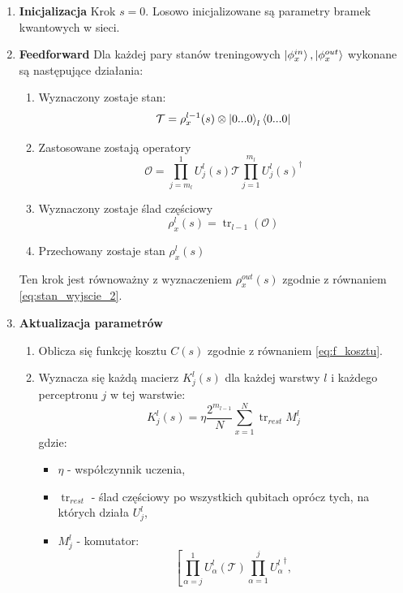 \begin{tcolorbox}[title=Algorytm trenowania głębokiej sieci kwantowej,
    colback=blue!5!white,colframe=blue!75!black,
    breakable]
    
    \begin{enumerate}
        \item \textbf{Inicjalizacja} Krok $s=0$. Losowo inicjalizowane są parametry bramek kwantowych w sieci.
        \item \textbf{Feedforward} Dla każdej pary stanów treningowych $\ket{\phi_x^{in}},\ket{\phi_x^{out}}$ wykonane są następujące działania:
        \begin{enumerate}
            \item Wyznaczony zostaje stan: \[\mathcal{T} =\rho_x^{l-1}(s)\otimes \ket{0...0}_l\bra{0...0} \]
            \item Zastosowane zostają operatory \[\mathcal{O} = \prod_{j=m_l}^{1}U_j^l(s)\mathcal{T}\prod_{j=1}^{m_l}{U_j^l(s)}^{\dagger} \]
            \item Wyznaczony zostaje ślad częściowy \[\rho_x^l(s) = \operatorname{tr}_{l-1}(\mathcal{O}) \]
            \item Przechowany zostaje stan $\rho_x^l(s)$ 
        \end{enumerate}
        Ten krok jest równoważny z wyznaczeniem $\rho_x^{out}(s)$ zgodnie z równaniem \ref{eq:stan_wyjscie_2}.
        \item \textbf{Aktualizacja parametrów}
        \begin{enumerate}
            \item Oblicza się funkcję kosztu $C(s)$ zgodnie z równaniem \ref{eq:f_kosztu}.
            \item Wyznacza się każdą macierz $K_j^l(s)$ dla każdej warstwy $l$ i każdego perceptronu $j$ w tej warstwie:
            \begin{equation}
                K_j^l(s)=\eta \frac{2^{m_{l-1}}}{N}\sum_{x=1}^{N}\operatorname{tr}_{rest}M_j^l
            \end{equation}
            gdzie:
            \begin{itemize}
                \item $\eta$ - współczynnik uczenia,
                \item $\operatorname{tr}_{rest}$ - ślad częściowy po wszystkich qubitach oprócz tych, na których działa $U_j^l$,
                \item $M_j^l$ - komutator:
                \[\left[\prod_{\alpha=j}^{1}U_{\alpha}^l(\mathcal{T})\prod_{\alpha=1}^{j}{U_{\alpha}^l}^{\dagger},
\]
\end{itemize}
\end{enumerate}
\end{enumerate}
\end{tcolorbox}
